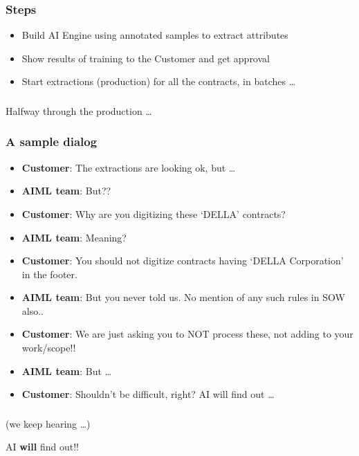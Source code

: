 \begin{frame}[fragile]\frametitle{Steps}
\begin{itemize}
\item Build AI Engine using annotated samples to extract attributes
\item Show results of training to the Customer and get approval
\item Start extractions (production) for all the contracts, in batches \ldots
\end{itemize}
\end{frame}

\begin{frame}[fragile]\frametitle{}
\begin{center}
{\Large Halfway through the production \ldots}
\end{center}
\end{frame}

\begin{frame}[fragile]\frametitle{A sample dialog}
\begin{itemize}
\item {\bf Customer}: The extractions are looking ok, but \ldots
\item {\bf AIML team}: But??
\item {\bf Customer}: Why are you digitizing these ‘DELLA' contracts?
\item {\bf AIML team}: Meaning?
\item {\bf Customer}: You should not digitize contracts having ‘DELLA Corporation' in the footer.
\item {\bf AIML team}: But you never told us. No mention of any such rules in SOW also..
\item {\bf Customer}: We are just asking you to NOT process these, not adding to your work/scope!!
\item {\bf AIML team}: But \ldots
\item {\bf Customer}: Shouldn't be difficult, right? AI will find out \ldots

\end{itemize}
\end{frame}

\begin{frame}[fragile]\frametitle{}
\begin{center}
(we keep hearing \ldots)


{\Huge AI {\bf will} find out!!}
\end{center}
\end{frame}


